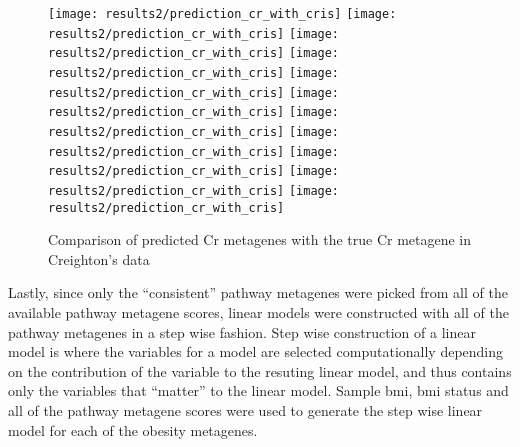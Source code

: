 \begin{figure}[htpb]
	\centering
	\texttt{[image: results2/prediction\_cr\_with\_cris]}
	\texttt{[image: results2/prediction\_cr\_with\_cris]}
	\texttt{[image: results2/prediction\_cr\_with\_cris]}
	\texttt{[image: results2/prediction\_cr\_with\_cris]}
	\texttt{[image: results2/prediction\_cr\_with\_cris]}
	\texttt{[image: results2/prediction\_cr\_with\_cris]}
	\texttt{[image: results2/prediction\_cr\_with\_cris]}
	\texttt{[image: results2/prediction\_cr\_with\_cris]}
	\texttt{[image: results2/prediction\_cr\_with\_cris]}
	\texttt{[image: results2/prediction\_cr\_with\_cris]}
	\texttt{[image: results2/prediction\_cr\_with\_cris]}
	\caption{Comparison of predicted Cr metagenes with the true Cr metagene in Creighton's data}
	\label{fig:predict_cr_cris}
\end{figure}

\noindent
Lastly, since only the ``consistent'' pathway metagenes were picked from all of the available pathway metagene scores, linear models were constructed with all of the pathway metagenes in a step wise fashion.
Step wise construction of a linear model is where the variables for a model are selected computationally depending on the contribution of the variable to the resuting linear model, and thus contains only the variables that ``matter'' to the linear model.
Sample \gls{bmi}, \gls{bmi} status and all of the pathway metagene scores were used to generate the step wise linear model for each of the obesity metagenes.






























